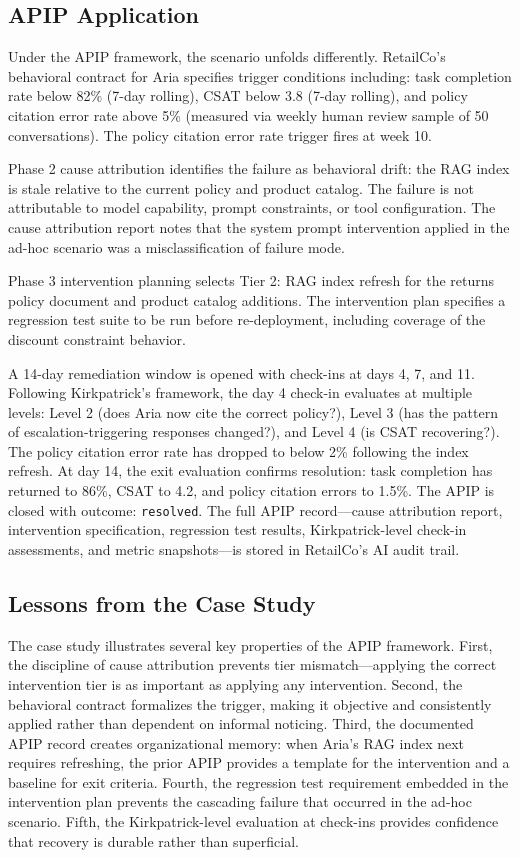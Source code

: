 \subsection{APIP Application}
\label{subsec:apip-application}

Under the APIP framework, the scenario unfolds differently. RetailCo's
behavioral contract for Aria specifies trigger conditions including: task
completion rate below 82\% (7-day rolling), CSAT below 3.8 (7-day rolling), and
policy citation error rate above 5\% (measured via weekly human review sample of
50 conversations). The policy citation error rate trigger fires at week 10.

Phase 2 cause attribution identifies the failure as behavioral drift: the RAG
index is stale relative to the current policy and product catalog. The failure
is not attributable to model capability, prompt constraints, or tool
configuration. The cause attribution report notes that the system prompt
intervention applied in the ad-hoc scenario was a misclassification of failure
mode.

Phase 3 intervention planning selects Tier 2: RAG index refresh for the returns
policy document and product catalog additions. The intervention plan specifies
a regression test suite to be run before re-deployment, including coverage of
the discount constraint behavior.

A 14-day remediation window is opened with check-ins at days 4, 7, and 11.
Following Kirkpatrick's framework, the day 4 check-in evaluates at multiple
levels: Level 2 (does Aria now cite the correct policy?), Level 3 (has the
pattern of escalation-triggering responses changed?), and Level 4 (is CSAT
recovering?). The policy citation error rate has dropped to below 2\% following
the index refresh. At day 14, the exit evaluation confirms resolution: task
completion has returned to 86\%, CSAT to 4.2, and policy citation errors to
1.5\%. The APIP is closed with outcome: \texttt{resolved}. The full APIP
record---cause attribution report, intervention specification, regression test
results, Kirkpatrick-level check-in assessments, and metric snapshots---is
stored in RetailCo's AI audit trail.

\subsection{Lessons from the Case Study}
\label{subsec:lessons}

The case study illustrates several key properties of the APIP framework. First,
the discipline of cause attribution prevents tier mismatch---applying the
correct intervention tier is as important as applying any intervention. Second,
the behavioral contract formalizes the trigger, making it objective and
consistently applied rather than dependent on informal noticing. Third, the
documented APIP record creates organizational memory: when Aria's RAG index
next requires refreshing, the prior APIP provides a template for the
intervention and a baseline for exit criteria. Fourth, the regression test
requirement embedded in the intervention plan prevents the cascading failure
that occurred in the ad-hoc scenario. Fifth, the Kirkpatrick-level evaluation
at check-ins provides confidence that recovery is durable rather than
superficial.
